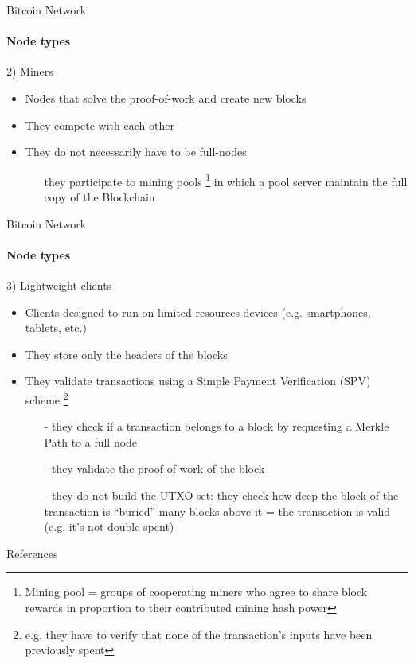\documentclass{beamer}
\begin{document}
  
   \begin{frame}{Bitcoin Network}
    \framesubtitle{Node types}
    \begin{block}{2) Miners}
        \begin{itemize}
            \item Nodes that solve the proof-of-work and create new blocks
            \item They compete with each other
            \item They do not necessarily have to be full-nodes
            \begin{itemize}
                \item[\MVRightarrow] they participate to mining pools \footnote{Mining pool = groups of cooperating miners who agree to share block rewards in proportion to their contributed mining hash power} in which a pool server maintain the full copy of the Blockchain
            \end{itemize}
        \end{itemize}
    \end{block}
  \end{frame}
  
  
  
  
  \begin{frame}{Bitcoin Network}
    \framesubtitle{Node types}
    \begin{block}{3) Lightweight clients}
        \begin{itemize}
            \item Clients designed to run on limited resources devices (e.g. smartphones, tablets, etc.) 
            \item They store only the headers of the blocks 
            \item They validate transactions using a Simple Payment Verification (SPV) scheme \footnote{e.g. they have to verify that none of the transaction's inputs have been previously spent}
            \begin{itemize}
                \item[-] they check if a transaction belongs to a block by requesting a Merkle Path to a full node
                \item[-] they validate the proof-of-work of the block
                \item[-] they do not build the UTXO set: they check how deep the block of the transaction is ``buried'' \MVRightarrow many blocks above it = the transaction is valid (e.g. it's not double-spent)
            \end{itemize}
        \end{itemize}
    \end{block}
  \end{frame}





  \begin{frame}{References}
    \printbibliography
  \end{frame}
\end{document}
